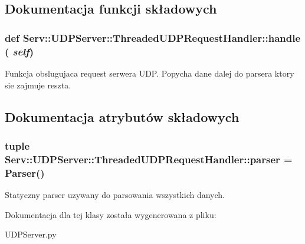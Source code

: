 \subsection{Dokumentacja funkcji składowych}
\hypertarget{class_serv_1_1_u_d_p_server_1_1_threaded_u_d_p_request_handler_a94afb499da79b188e658f8b2d4bffb9a}{
\subsubsection[{handle}]{\setlength{\rightskip}{0pt plus 5cm}def Serv::UDPServer::ThreadedUDPRequestHandler::handle ( {\em self})}}
\label{class_serv_1_1_u_d_p_server_1_1_threaded_u_d_p_request_handler_a94afb499da79b188e658f8b2d4bffb9a}
\begin{DoxyVerb}Funkcja obslugujaca request serwera UDP.
Popycha dane dalej do parsera ktory sie zajmuje reszta.
\end{DoxyVerb}
 

\subsection{Dokumentacja atrybutów składowych}
\hypertarget{class_serv_1_1_u_d_p_server_1_1_threaded_u_d_p_request_handler_ac0a5ee1efde591fb33de85283b9b4d3f}{
\subsubsection[{parser}]{\setlength{\rightskip}{0pt plus 5cm}tuple {\bf Serv::UDPServer::ThreadedUDPRequestHandler::parser} = {\bf Parser}()}}
\label{class_serv_1_1_u_d_p_server_1_1_threaded_u_d_p_request_handler_ac0a5ee1efde591fb33de85283b9b4d3f}


Statyczny parser uzywany do parsowania wszystkich danych. 



Dokumentacja dla tej klasy została wygenerowana z pliku:\begin{DoxyCompactItemize}
\item 
UDPServer.py\end{DoxyCompactItemize}
